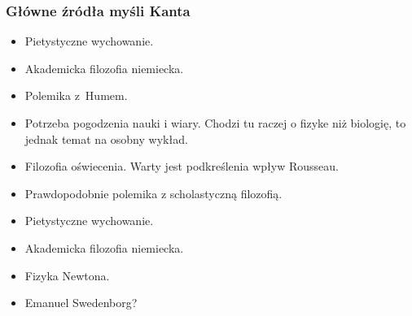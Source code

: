 \documentclass[10pt,t]{beamer}
\begin{document}
\begin{frame}
  \frametitle{Główne źródła myśli Kanta}


  \begin{itemize}

  \item Pietystyczne wychowanie.

  \item Akademicka filozofia niemiecka.

  \item Polemika z~Humem.

  \item Potrzeba pogodzenia nauki i wiary. Chodzi tu raczej o fizyke niż
    biologię, to jednak temat na osobny wykład.

  \item Filozofia oświecenia. Warty jest podkreślenia wpływ Rousseau.

  \item Prawdopodobnie polemika z scholastyczną filozofią.

  \item Pietystyczne wychowanie.

  \item Akademicka filozofia niemiecka.

  \item Fizyka Newtona.

  \item Emanuel Swedenborg?

  \end{itemize}

\end{frame}
\end{document}
